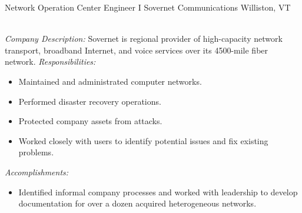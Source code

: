 \begin{samepage}
{Network Operation Center Engineer I}
{Sovernet Communications}
{Williston, VT}{}
{
\emph{\\Company Description:}
Sovernet is regional provider of high-capacity network transport,
broadband Internet, and voice services over its 4500-mile fiber
network.
\newline{}
\newline{}
\emph{Responsibilities:}
\begin{itemize}
\item Maintained and administrated computer networks.
\item Performed disaster recovery operations.
\item Protected company assets from attacks.
\item Worked closely with users to identify potential issues and fix existing problems.\\
\end{itemize}
\emph{Accomplishments:}
\begin{itemize}
\item
Identified informal company processes and worked with leadership to
develop documentation for over a dozen acquired heterogeneous
networks.\\
\end{itemize}
}
\end{samepage}
